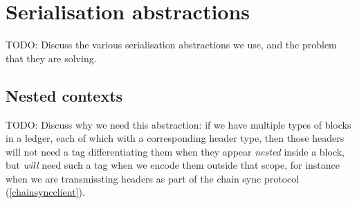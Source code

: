 \chapter{Serialisation abstractions}
\label{serialisation}

TODO: Discuss the various serialisation abstractions we use, and the problem that
they are solving.

\section{Nested contexts}
\label{serialisation:nested-contexts}

TODO: Discuss why we need this abstraction: if we have multiple types of blocks
in a ledger, each of which with a corresponding header type, then those headers
will not need a tag differentiating them when they appear \emph{nested} inside
a block, but \emph{will} need such a tag when we encode them outside that scope,
for instance when we are transmissting headers as part of the chain sync
protocol (\cref{chainsyncclient}).
